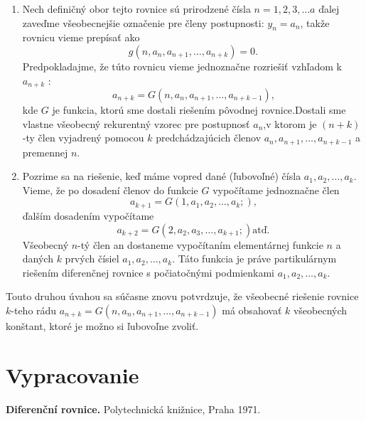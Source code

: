 \documentclass[a4paper,10pt]{article}
\theoremstyle{plain}
\theoremstyle{definition}
\begin{document}
\begin{enumerate}
	\item Nech definičný obor tejto rovnice sú prirodzené čísla $ n = 1, 2, 3, \ldots a$
		ďalej zaveďme všeobecnejšie označenie pre členy postupnosti: $ y_{n} =  a_{n}$,
		takže rovnicu vieme prepísať ako  $$g(n, a_{n}, a_{n+1}, \ldots, a_{n+k}) = 0\text{.}$$
		Predpokladajme, že túto rovnicu vieme jednoznačne rozriešiť vzhľadom k $ a_{n+k}$ :
		$$a_{n+k} = G(n, a_{n}, a_{n+1}, \ldots, a_{n+k-1})\text{,}$$
		kde $G$ je funkcia, ktorú sme dostali riešením pôvodnej rovnice.\linebreak[4]
		 Dostali sme vlastne všeobecný rekurentný vzorec pre postupnosť $a_{n}$,\linebreak[4] v ktorom je $(n+k)$-ty 				člen vyjadrený pomocou $k$ predchádzajúcich členov 
		$a_{n}, a_{n+1}, \ldots, a_{n+k-1}$ a premennej $n$.
	\item Pozrime sa na riešenie, keď máme vopred dané (ľubovoľné) čísla $ a_{1}, a_{2}, \ldots, a_{k}$.
		Vieme, že po dosadení členov do funkcie $G$ vypočítame jednoznačne člen
		$$a_{k+1} = G(1, a_{1}, a_{2}, \ldots, a_{k};)\text{,}$$ ďalším dosadením vypočítame
		$$a_{k+2} = G(2, a_{2}, a_{3}, \ldots, a_{k+1};)\text{atď.}$$
		Všeobecný $n$-tý člen an dostaneme vypočítaním elementárnej funkcie
		$n$ a daných $k$ prvých čísiel $ a_{1}, a_{2}, \ldots, a_{k}$. Táto funkcia je práve partikulárnym riešením 				diferenčnej rovnice s počiatočnými podmienkami $ a_{1}, a_{2}, \ldots, a_{k}$.	
\end{enumerate}

Touto druhou úvahou sa súčasne znovu potvrdzuje, že všeobecné riešenie rovnice $k$-teho rádu 
$a_{n+k} = G(n, a_{n}, a_{n+1}, \ldots, a_{n+k-1})$ má obsahovať
$k$ všeobecných konštant, ktoré je možno si ľubovoľne zvoliť.


\section{Vypracovanie}


\begin{thebibliography}{9}
               {\bf Diferenční rovnice.}
           Polytechnická knižnice, Praha 1971.
\end{thebibliography}
\end{document}
